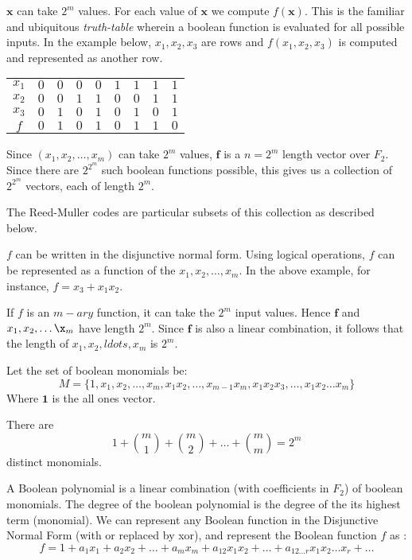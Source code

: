 \documentclass{article}
\newcommand{\V}[1]{\ensuremath{\mathbf{#1}}}
\theoremstyle{plain}
\begin{document}
$\V{x}$ can take $2^m$ values. For each value of $\V{x}$ we compute $f(\V{x})$. This is the familiar and ubiquitous \emph{truth-table} wherein a boolean function is evaluated for all possible inputs.
In the example below, $x_1, x_2, x_3$ are rows and $f(x_1, x_2, x_3)$ is computed and represented as another row. 
\begin {center}
\begin{tabular}{|c|c|c|c|c|c|c|c|c|}
$x_1$ & $0$ & $0$ & $0$ & $0$ & $1$ & $1$ & $1$ & $1$ \\
$x_2$ & $0$ & $0$ & $1$ & $1$ & $0$ & $0$ & $1$ & $1$ \\
$x_3$ & $0$ & $1$ & $0$ & $1$ & $0$ & $1$ & $0$ & $1$ \\
$f$   & $0$ & $1$ & $0$ & $1$ & $0$ & $1$ & $1$ & $0$ \\

\end{tabular}
\end{center} 

Since $(x_1,x_2,\ldots,x_m)$ can take $2^m$ values, $\V{f}$ is a $n=2^m$ length vector over $F_2$. Since there are $2^2^m$ such boolean functions possible, this gives us a collection of  $2^2^m$ vectors, each of length $2^m$.
 
The Reed-Muller codes are particular subsets of this collection as described below.

$f$ can be written in the disjunctive normal form.
Using logical operations, $f$ can be represented as a function of the $x_1, x_2,\ldots , x_m$. In the above example, for instance, $f = x_3 + x_1x_2$. 

If $f$ is an $m-ary$ function, it can take the $2^m$ input values. Hence $\V{f}$ and $x_1,x_2,\ldots \x_m$ have length $2^m$. Since $\V{f}$ is also a linear combination, it follows that the length of $x_1, x_2,ldots,x_m$ is $2^m$. 

Let the set of boolean monomials be:
\begin{equation*}
M = \{1,x_1,x_2,\ldots,x_m,x_1x_2,\ldots,x_{m-1}x_m,x_1x_2x_3,\ldots,x_1x_2\ldots x_m\}
\end{equation*}
Where $\V{1}$ is the all ones vector.

There are
\begin{equation*}
  1+\binom{m}{1}+\binom{m}{2}+\ldots+\binom{m}{m} = 2^m 
\end{equation*}
distinct monomials. 

A Boolean polynomial is a linear combination (with coefficients in $F_2$) of boolean monomials. The degree of the boolean polynomial is the degree of the its highest term (monomial).
We can represent any Boolean function in the Disjunctive Normal Form (with or replaced by xor), and represent the Boolean function $f$ as :
\begin{equation*}
  f = 1 + a_1x_1+a_2x_2+\ldots+a_mx_m + a_{12}x_1x_2+\ldots+a_{12\ldots r}x_1x_2\ldots x_r+\ldots
\end{equation*}
\end{document}
